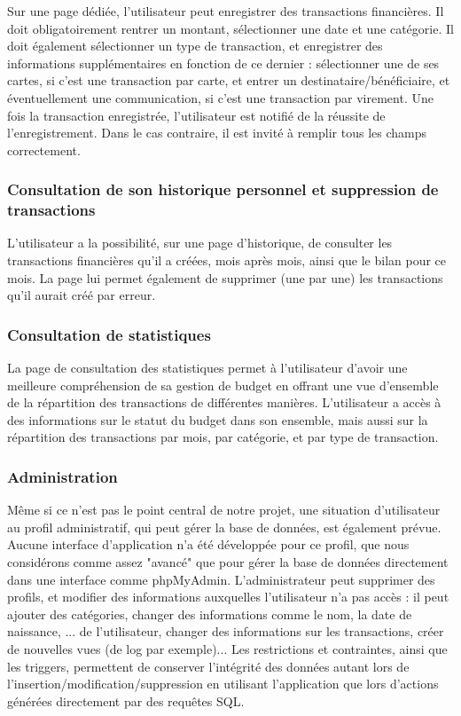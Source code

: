 \documentclass[a4paper,12pt]{article}
\begin{document}
Sur une page dédiée, l'utilisateur peut enregistrer des transactions financières.
Il doit obligatoirement rentrer un montant, sélectionner une date et une catégorie.
Il doit également sélectionner un type de transaction, et enregistrer des informations supplémentaires en fonction de ce dernier : sélectionner une de ses cartes, si c'est une transaction par carte, et entrer un destinataire/bénéficiaire,  et éventuellement une communication, si c'est une transaction par virement.
Une fois la transaction enregistrée, l'utilisateur est notifié de la réussite de l'enregistrement. 
Dans le cas contraire, il est invité à remplir tous les champs correctement.

\subsubsection{Consultation de son historique personnel et suppression de transactions}

L'utilisateur a la possibilité, sur une page d'historique, de consulter les transactions financières qu'il a créées, mois après mois, ainsi que le bilan pour ce mois.
La page lui permet également de supprimer (une par une) les transactions qu'il aurait créé par erreur.

\subsubsection{Consultation de statistiques}

La page de consultation des statistiques permet à l'utilisateur d'avoir une meilleure compréhension de sa gestion de budget en offrant une vue d'ensemble de la répartition des transactions de différentes manières.
L'utilisateur a accès à des informations sur le statut du budget dans son ensemble, mais aussi sur la répartition des transactions par mois, par catégorie, et par type de transaction.

\subsubsection{Administration}

Même si ce n'est pas le point central de notre projet, une situation d'utilisateur au profil administratif, qui peut gérer la base de données, est également prévue.
Aucune interface d'application n'a été développée pour ce profil, que nous considérons comme assez "avancé" que pour gérer la base de données directement dans une interface comme phpMyAdmin.
L'administrateur peut supprimer des profils, et modifier des informations auxquelles l'utilisateur n'a pas accès : il peut ajouter des catégories, changer des informations comme le nom, la date de naissance, ... de l'utilisateur, changer des informations sur les transactions, créer de nouvelles vues (de log par exemple)... Les restrictions et contraintes, ainsi que les triggers, permettent de conserver l'intégrité des données autant lors de l'insertion/modification/suppression en utilisant l'application que lors d'actions générées directement par des requêtes SQL.
\end{document}

